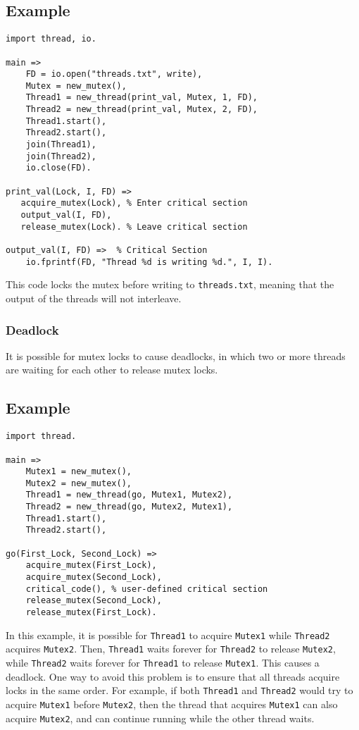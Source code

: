 \subsection*{Example}
\begin{verbatim}
import thread, io.

main =>
    FD = io.open("threads.txt", write),
    Mutex = new_mutex(),
    Thread1 = new_thread(print_val, Mutex, 1, FD),
    Thread2 = new_thread(print_val, Mutex, 2, FD),
    Thread1.start(),
    Thread2.start(),
    join(Thread1),
    join(Thread2),
    io.close(FD).

print_val(Lock, I, FD) =>
   acquire_mutex(Lock), % Enter critical section
   output_val(I, FD),
   release_mutex(Lock). % Leave critical section

output_val(I, FD) =>  % Critical Section
    io.fprintf(FD, "Thread %d is writing %d.", I, I). 
\end{verbatim}

This code locks the mutex before writing to \texttt{threads.txt}, meaning that the output of the threads will not interleave.

\subsubsection{Deadlock}
It is possible for mutex locks to cause deadlocks, in which two or more threads are waiting for each other to release mutex locks.

\subsection*{Example}
\begin{verbatim}
import thread.

main =>
    Mutex1 = new_mutex(),
    Mutex2 = new_mutex(),
    Thread1 = new_thread(go, Mutex1, Mutex2),
    Thread2 = new_thread(go, Mutex2, Mutex1),
    Thread1.start(),
    Thread2.start(),

go(First_Lock, Second_Lock) =>
    acquire_mutex(First_Lock),
    acquire_mutex(Second_Lock),
    critical_code(), % user-defined critical section
    release_mutex(Second_Lock),
    release_mutex(First_Lock).
\end{verbatim}

In this example, it is possible for \texttt{Thread1} to acquire \texttt{Mutex1} while \texttt{Thread2} acquires \texttt{Mutex2}.  Then, \texttt{Thread1} waits forever for \texttt{Thread2} to release \texttt{Mutex2}, while \texttt{Thread2} waits forever for \texttt{Thread1} to release \texttt{Mutex1}.  This causes a deadlock.  One way to avoid this problem is to ensure that all threads acquire locks in the same order.  For example, if both \texttt{Thread1} and \texttt{Thread2} would try to acquire \texttt{Mutex1} before \texttt{Mutex2}, then the thread that acquires \texttt{Mutex1} can also acquire \texttt{Mutex2}, and can continue running while the other thread waits.

